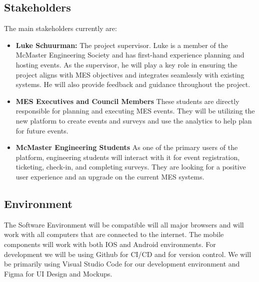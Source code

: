 \documentclass{article}
\begin{document}
\subsection{Stakeholders}
The main stakeholders currently are:
\begin{itemize}
    \item \textbf{Luke Schuurman:} The project supervisor.\newline
        Luke is a member of the McMaster Engineering Society and has first-hand experience planning and hosting events. As the supervisor, he will play a key role in ensuring the project aligns with MES objectives and integrates seamlessly with existing systems. He will also provide feedback and guidance throughout the project.
    \item \textbf{MES Executives and Council Members}\newline
    These students are directly responsible for planning and executing MES events. They will be utilizing the new platform to create events and surveys and use the analytics to help plan for future events.
    \item \textbf{McMaster Engineering Students} \newline
    As one of the primary users of the platform, engineering students will interact with it for event registration, ticketing, check-in, and completing surveys. They are looking for a positive user experience and an upgrade on the current MES systems.
\end{itemize}
\subsection{Environment}
The Software Environment will be compatible will all major browsers and will work with all computers that are connected to the internet. The mobile components will work with both IOS and Android environments. For development we will be using Github for CI/CD and for version control. We will be primarily using Visual Studio Code for our development environment and Figma for UI Design and Mockups.
\end{document}
